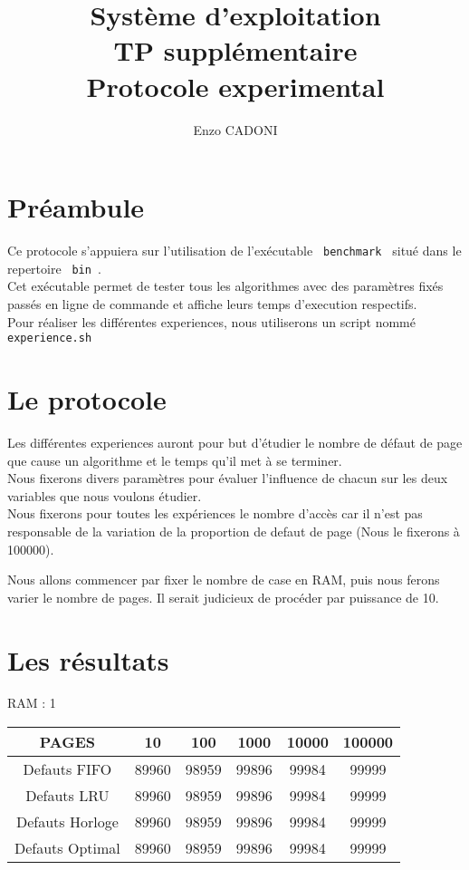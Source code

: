 \documentclass[a4paper, 10pt]{article}
\title{Système d'exploitation \\ TP supplémentaire \\ Protocole experimental}
\author{Enzo CADONI}
\date{}
\begin{document}
  \maketitle
  \newpage

  \section{Préambule}
    Ce protocole s'appuiera sur l'utilisation de l'exécutable \verb+ benchmark +
    situé dans le repertoire \verb+ bin +. \\

    Cet exécutable permet de tester tous les algorithmes avec des paramètres
    fixés passés en ligne de commande et affiche leurs temps d'execution
    respectifs. \\

    Pour réaliser les différentes experiences, nous utiliserons un script nommé
    \verb+ experience.sh +

  \section{Le protocole}
    Les différentes experiences auront pour but d'étudier le nombre de défaut
    de page que cause un algorithme et le temps qu'il met à se terminer. \\

    Nous fixerons divers paramètres pour évaluer l'influence de chacun sur
    les deux variables que nous voulons étudier. \\

    Nous fixerons pour toutes les expériences le nombre d'accès car il n'est
    pas responsable de la variation de la proportion de defaut de page
    (Nous le fixerons à 100000).

    Nous allons commencer par fixer le nombre de case en RAM, puis nous ferons
    varier le nombre de pages.
    Il serait judicieux de procéder par puissance de 10.

  \section{Les résultats}
    RAM : 1 \\
    \begin{tabular}{|c|c|c|c|c|c|}
      \hline
        PAGES             & 10 & 100 & 1000 & 10000 & 100000 \\
      \hline
        Defauts FIFO    & 89960 & 98959 & 99896 &  99984 & 99999 \\
      \hline
        Defauts LRU     & 89960 & 98959 & 99896 & 99984 & 99999 \\
      \hline
        Defauts Horloge & 89960 & 98959 & 99896 & 99984 & 99999 \\
      \hline
        Defauts Optimal & 89960 & 98959 & 99896 & 99984 & 99999 \\
      \hline
    \end{tabular} \\
\end{document}

